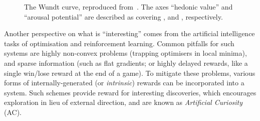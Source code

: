 \begin{figure}
  \centering

  \caption{The Wundt curve, reproduced from~\cite{berlyne1970novelty}. The axes
    ``hedonic value'' and ``arousal potential'' are described as covering
    , and , respectively.}
  \label{fig:wundt}
\end{figure}

Another perspective on what is ``interesting'' comes from the artificial
intelligence tasks of optimisation and reinforcement learning. Common pitfalls
for such systems are highly non-convex problems (trapping optimisers in local
minima), and sparse information (such as flat gradients; or highly delayed
rewards, like a single win/lose reward at the end of a game). To mitigate these problems, various forms of internally-generated (or \emph{intrinsic}) rewards
can be incorporated into a system. Such schemes provide reward for interesting
discoveries, which encourages exploration in lieu of external direction, and are
known as \emph{Artificial Curiosity}~\cite{schmidhuber2006developmental} (AC).

